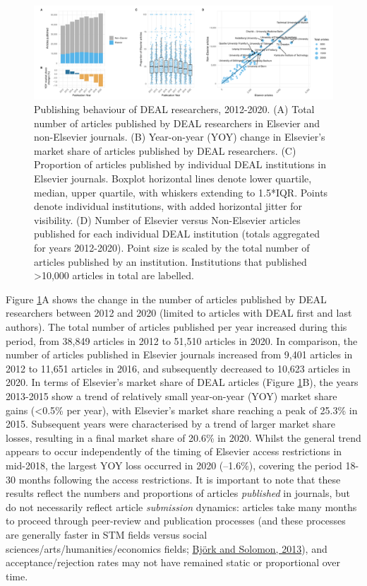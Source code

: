 \documentclass[
]{article}
\begin{document}
\begin{figure}
\centering
\includegraphics{analysis_files/figure-latex/items-publisher-year-1.pdf}
\caption{\label{fig:items-publisher-year}Publishing behaviour of DEAL researchers, 2012-2020. (A) Total number of articles published by DEAL researchers in Elsevier and non-Elsevier journals. (B) Year-on-year (YOY) change in Elsevier's market share of articles published by DEAL researchers. (C) Proportion of articles published by individual DEAL institutions in Elsevier journals. Boxplot horizontal lines denote lower quartile, median, upper quartile, with whiskers extending to 1.5*IQR. Points denote individual institutions, with added horizontal jitter for visibility. (D) Number of Elsevier versus Non-Elsevier articles published for each individual DEAL institution (totals aggregated for years 2012-2020). Point size is scaled by the total number of articles published by an institution. Institutions that published \textgreater10,000 articles in total are labelled.}
\end{figure}

Figure \ref{fig:items-publisher-year}A shows the change in the number of articles published by DEAL researchers between 2012 and 2020 (limited to articles with DEAL first and last authors). The total number of articles published per year increased during this period, from 38,849 articles in 2012 to 51,510 articles in 2020. In comparison, the number of
articles published in Elsevier journals increased from 9,401 articles in 2012 to 11,651 articles in 2016, and subsequently decreased to 10,623 articles in 2020. In terms of Elsevier's market share of DEAL articles (Figure \ref{fig:items-publisher-year}B), the years 2013-2015 show a trend of relatively small year-on-year (YOY) market share gains (\textless0.5\% per year), with Elsevier's market share reaching a peak of 25.3\% in 2015. Subsequent years were characterised by a trend of larger market share losses, resulting in a final market share of 20.6\% in 2020. Whilst the general trend appears to occur independently of the timing of Elsevier access restrictions in mid-2018, the largest YOY loss occurred in 2020 (--1.6\%), covering the period 18-30 months following the access restrictions. It is important to note that these results reflect the numbers and proportions of articles \emph{published} in journals, but do not necessarily reflect article \emph{submission} dynamics: articles take many months to proceed through peer-review and publication processes (and these processes are generally faster in STM fields versus social sciences/arts/humanities/economics fields; \href{https://doi.org/10.1016/j.joi.2013.09.001}{Björk and Solomon, 2013}), and acceptance/rejection rates may not have remained static or proportional over time.
\end{document}
